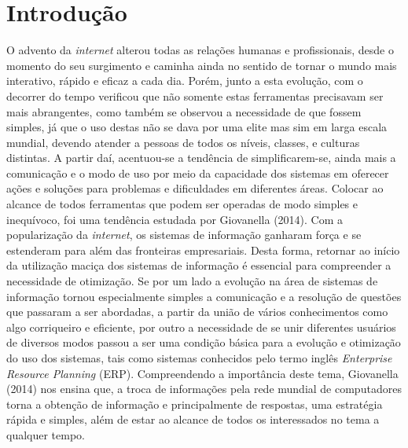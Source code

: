 \setcounter{page}{3}
\chapter{Introdução} \label{Introdução}
O advento da \textit{internet} alterou todas as relações humanas e profissionais, desde o momento do seu surgimento e caminha ainda no sentido de tornar o mundo mais interativo, rápido e eficaz a cada dia. Porém, junto a esta evolução, com o decorrer do tempo verificou que não somente estas ferramentas precisavam ser mais abrangentes, como também se observou a necessidade de que fossem simples, já que o uso destas não se dava por uma elite mas sim em larga escala mundial, devendo atender a pessoas de todos os níveis, classes, e culturas distintas.\newline
\indent A partir daí, acentuou-se a tendência de simplificarem-se, ainda mais a comunicação e o modo de uso por meio da capacidade dos sistemas em oferecer ações e soluções para problemas e dificuldades em diferentes áreas. Colocar ao alcance de todos ferramentas que podem ser operadas de modo simples e inequívoco, foi uma tendência estudada por Giovanella (2014).\newline
\indent Com a popularização da \textit{internet}, os sistemas de informação ganharam força e se estenderam para além das fronteiras empresariais. Desta forma, retornar ao início da utilização maciça dos sistemas de informação é essencial para compreender a necessidade de otimização.\newline
\indent Se por um lado a evolução na área de sistemas de informação tornou especialmente simples a comunicação e a resolução de questões que passaram a ser abordadas, a partir da união de vários conhecimentos como algo corriqueiro e eficiente, por outro a necessidade de se unir diferentes usuários de diversos modos passou a ser uma condição básica para a evolução e otimização do uso dos sistemas, tais como sistemas conhecidos pelo termo inglês \textit{Enterprise Resource Planning} (ERP). \newline
\indent Compreendendo a importância deste tema, Giovanella (2014) nos ensina que, a troca de informações pela rede mundial de computadores torna a obtenção de informação e principalmente de respostas, uma estratégia rápida e simples, além de estar ao alcance de todos os interessados no tema a qualquer tempo. \newline
